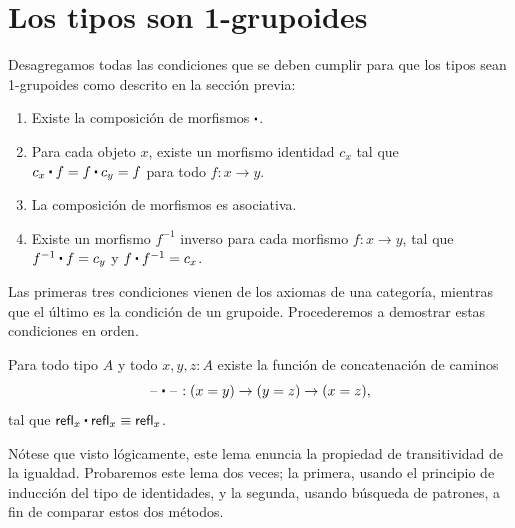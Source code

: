 \documentclass[../main.tex]{subfiles}
\begin{document}
\section{Los tipos son 1-grupoides}
Desagregamos todas las condiciones que se deben cumplir para que los tipos sean 1-grupoides como descrito en la secci\'on previa:

\begin{enumerate}
  \item Existe la composición de morfismos $\ct$.
  \item Para cada objeto $x$, existe un morfismo identidad $c_x$ tal que $c_x \ct f = f \ct c_y = f$ para todo $f:x \to y$.
  \item La composición de morfismos es asociativa.
  \item Existe un morfismo $f^{-1}$ inverso para cada morfismo $f:x \to y$, tal que $f^{-1} \ct f=c_y$ y $f \ct f^{-1}=c_x$.
\end{enumerate}

Las primeras tres condiciones vienen de los axiomas de una categor\'ia, mientras que el \'ultimo es la condici\'on de un grupoide. Procederemos a demostrar estas condiciones en orden.

\begin{lemma}
  Para todo tipo $A$ y todo $x,y,z:A$ existe la función de concatenaci\'on de caminos
  \begin{equation*}
    {\blank} \ct {\blank} : (x= y) \to   (y= z)\to (x=  z),
  \end{equation*}
  tal que $\refl{x}\ct \refl{x}\jdeq \refl{x}$.
\end{lemma}

N\'otese que visto l\'ogicamente, este lema enuncia la propiedad de transitividad de la igualdad.
Probaremos este lema dos veces; la primera, usando el principio de inducci\'on del tipo de identidades, y la segunda, usando b\'usqueda de patrones, a fin de comparar estos dos m\'etodos.
\end{document}
